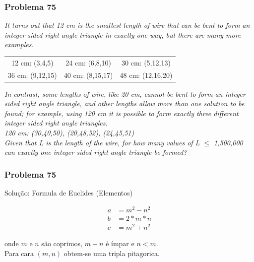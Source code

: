\documentclass{beamer}
\begin{document}
\begin{frame}
    \frametitle{Problema 75}

    \begin{center}
        \textit{
            \small It turns out that 12 cm is the smallest length of wire that can be bent to form an integer sided right angle triangle in exactly one way, but there are many more examples.\\
        }
        \begin{table}[htpb]
            \centering
            \begin{tabular}{c c c}
                12 cm: (3,4,5)   & 24 cm: (6,8,10)  & 30 cm: (5,12,13)\\
                36 cm: (9,12,15) & 40 cm: (8,15,17) & 48 cm: (12,16,20)\\
            \end{tabular}
        \end{table}
        \textit{
            \small In contrast, some lengths of wire, like 20 cm, cannot be bent to form an integer sided right angle triangle, and other lengths allow more than one solution to be found; for example, using 120 cm it is possible to form exactly three different integer sided right angle triangles.\\
        }
        \textit{
            120 cm: (30,40,50), (20,48,52), (24,45,51)\\
        }
        \textit{
            \small Given that L is the length of the wire, for how many values of L $\leq$ 1,500,000 can exactly one integer sided right angle triangle be formed?\\
        }
    \end{center}
\end{frame}

\begin{frame}
    \frametitle{Problema 75}

    Solução: Formula de Euclides (Elementos)

    \begin{align}
        a & = m^2 - n^2 \\
        b & = 2*m*n     \\
        c & = m^2 + n^2
    \end{align}

    onde $m$ e $n$ são coprimos, $m+n$ é ímpar e $n < m$. \\
    Para cara $(m, n)$ obtem-se uma tripla pitagorica.
\end{frame}
\end{document}
